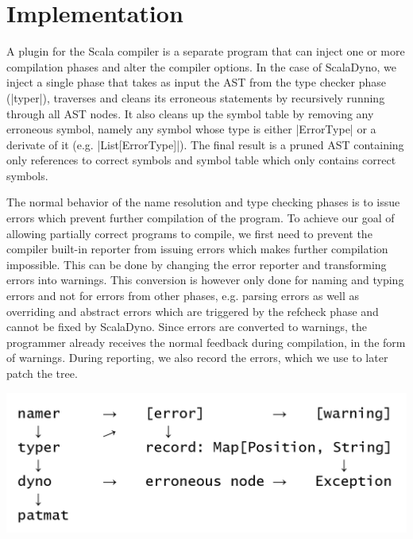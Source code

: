 \section{Implementation}

A plugin for the Scala compiler is a separate program that can inject one or more compilation phases and alter the compiler options. In the case of ScalaDyno, we inject a single phase that takes as input the AST from the type checker phase (|typer|), traverses and cleans its erroneous statements by recursively running through all AST nodes. It also cleans up the symbol table by removing any erroneous symbol, namely any symbol whose type is either |ErrorType| or a derivate of it (e.g. |List[ErrorType]|). The final result is a pruned AST containing only references to correct symbols and symbol table which only contains correct symbols.

The normal behavior of the name resolution and type checking phases is to issue errors which prevent further compilation of the program. To achieve our goal of allowing partially correct programs to compile, we first need to prevent the compiler built-in reporter from issuing errors which makes further compilation impossible. This can be done by changing the error reporter and transforming errors into warnings. This conversion is however only done for naming and typing errors and not for errors from other phases, e.g. parsing errors as well as overriding and abstract errors which are triggered by the refcheck phase and cannot be fixed by ScalaDyno. Since errors are converted to warnings, the programmer already receives the normal feedback during compilation, in the form of warnings. During reporting, we also record the errors, which we use to later patch the tree.

\includegraphics[width=0.9\columnwidth]{compiler_structure.png}

